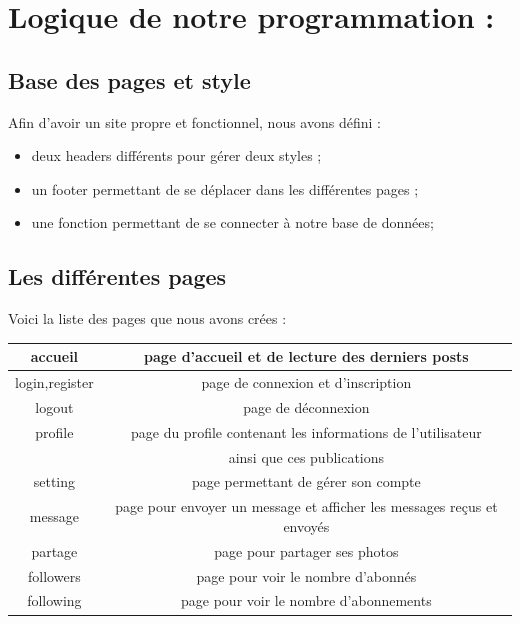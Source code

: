 \documentclass[12pt,a4paper]{article}
\begin{document}
\newpage

\section{Logique de notre programmation :}
\subsection{Base des pages et style}
  Afin d'avoir un site propre et fonctionnel, nous avons défini :
  \begin{itemize}
  \item deux headers différents pour gérer deux styles ;
  \item un footer permettant de se déplacer dans les différentes pages ;
  \item une fonction permettant de se connecter à notre base de données;
  \end{itemize}

\subsection{Les différentes pages}
  Voici la liste des pages que nous avons crées :
  \begin{center}
   \begin{tabular}{|c|c|} %
   \hline
   accueil & page d'accueil et de lecture des derniers posts \\
   \hline
   login,register & page de connexion et d'inscription \\
   \hline
   logout & page de déconnexion \\
   \hline
   profile & page du profile contenant les informations de l'utilisateur \\ & ainsi que ces publications \\
   \hline
   setting & page permettant de gérer son compte \\
   \hline
   message & page pour envoyer un message et afficher les messages reçus et envoyés \\
   \hline
   partage & page pour partager ses photos \\
   \hline
   followers & page pour voir le nombre d'abonnés  \\
   \hline
   following & page pour voir le nombre d'abonnements \\
   \hline
   \end{tabular}
  \end{center}
  
\end{document}
